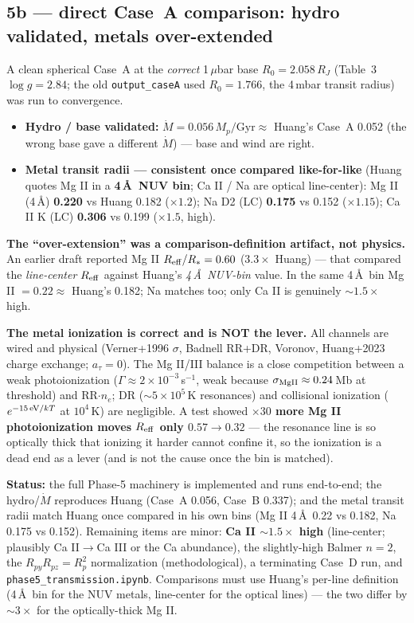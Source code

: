 \documentclass[english,a4paper]{kiseon_memo}
\begin{document}
\subsection{5b --- direct Case~A comparison: hydro validated, metals over-extended}
A clean spherical Case~A at the \emph{correct} 1\,\(\mu\)bar base \(R_0=2.058\,R_J\) (Table~3
\(\log g=2.84\); the old \texttt{output\_caseA} used \(R_0=1.766\), the 4\,mbar transit
radius) was run to convergence.
\begin{itemize}
\item \textbf{Hydro / base validated:} \(\dot M=0.056\,M_p/\mathrm{Gyr}\approx\) Huang's
Case~A 0.052 (the wrong base gave a different \(\dot M\)) --- base and wind are right.
\item \textbf{Metal transit radii --- consistent once compared like-for-like} (Huang quotes
Mg II in a \textbf{4\,\AA\ NUV bin}; Ca II / Na are optical line-center): Mg II (4\,\AA)
\textbf{0.220} vs Huang 0.182 (\(\times1.2\)); Na D2 (LC) \textbf{0.175} vs 0.152
(\(\times1.15\)); Ca II K (LC) \textbf{0.306} vs 0.199 (\(\times1.5\), high).
\end{itemize}
\textbf{The ``over-extension'' was a comparison-definition artifact, not physics.} An earlier
draft reported Mg II \(R_{\rm eff}/R_*=0.60\) (\(3.3\times\) Huang) --- that compared the
\emph{line-center} \(R_{\rm eff}\) against Huang's \emph{4\,\AA\ NUV-bin} value. In the same
4\,\AA\ bin Mg II \(=0.22\approx\) Huang's 0.182; Na matches too; only Ca II is genuinely
\(\sim1.5\times\) high.

\textbf{The metal ionization is correct and is NOT the lever.} All channels are wired and
physical (Verner+1996 \(\sigma\), Badnell RR+DR, Voronov, Huang+2023 charge exchange;
\(a_\tau=0\)). The Mg II/III balance is a close competition between a weak photoionization
(\(\Gamma\approx2\times10^{-3}\,\)s\(^{-1}\), weak because \(\sigma_{\rm MgII}\approx0.24\)\,Mb
at threshold) and RR\(\cdot n_e\); DR (\(\sim5\times10^5\)\,K resonances) and collisional
ionization (\(e^{-15\,{\rm eV}/kT}\) at \(10^4\)\,K) are negligible. A test showed
\textbf{\(\times30\) more Mg II photoionization moves \(R_{\rm eff}\) only \(0.57\to0.32\)} ---
the resonance line is so optically thick that ionizing it harder cannot confine it, so the
ionization is a dead end as a lever (and is not the cause once the bin is matched).

\textbf{Status:} the full Phase-5 machinery is implemented and runs end-to-end; the
hydro/\(\dot M\) reproduces Huang (Case~A 0.056, Case~B 0.337); and the metal transit radii
match Huang once compared in his own bins (Mg II 4\,\AA\ 0.22 vs 0.182, Na 0.175 vs 0.152).
Remaining items are minor: \textbf{Ca II \(\sim1.5\times\) high} (line-center; plausibly
Ca II\(\to\)Ca III or the Ca abundance), the slightly-high Balmer \(n=2\), the
\(R_{py}R_{pz}=R_p^2\) normalization (methodological), a terminating Case~D run, and
\texttt{phase5\_transmission.ipynb}. Comparisons must use Huang's per-line definition (4\,\AA\
bin for the NUV metals, line-center for the optical lines) --- the two differ by \(\sim3\times\)
for the optically-thick Mg II.
\end{document}

